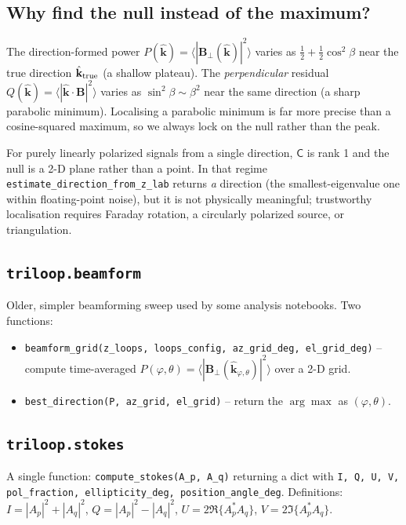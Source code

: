 \documentclass[11pt]{article}
\begin{document}
\subsection{Why find the null instead of the maximum?}
\label{sec:rank1ref}

The direction-formed power
$P(\hat{\mathbf k}) = \langle|\mathbf B_\perp(\hat{\mathbf k})|^2\rangle$
varies as $\frac12 + \frac12\cos^2\beta$ near the true direction
$\hat{\mathbf k}_{\rm true}$ (a shallow plateau).  The
\emph{perpendicular} residual
$Q(\hat{\mathbf k}) = \langle|\hat{\mathbf k}\cdot\mathbf B|^2\rangle$
varies as $\sin^2\beta\sim\beta^2$ near the same direction (a sharp
parabolic minimum).  Localising a parabolic minimum is far more
precise than a cosine-squared maximum, so we always lock on the null
rather than the peak.

For purely linearly polarized signals from a single direction,
$\mathsf{C}$ is rank 1 and the null is a 2-D plane rather than a
point.  In that regime \texttt{estimate\_direction\_from\_z\_lab}
returns \emph{a} direction (the smallest-eigenvalue one within
floating-point noise), but it is not physically meaningful; trustworthy
localisation requires Faraday rotation, a circularly polarized source,
or triangulation.

\subsection{\texttt{triloop.beamform}}

Older, simpler beamforming sweep used by some analysis notebooks.
Two functions:

\begin{itemize}\itemsep=2pt
\item \texttt{beamform\_grid(z\_loops, loops\_config, az\_grid\_deg,
      el\_grid\_deg)} -- compute time-averaged
      $P(\varphi, \theta) = \langle|\mathbf B_\perp(\hat{\mathbf k}_{\varphi,\theta})|^2\rangle$
      over a 2-D grid.
\item \texttt{best\_direction(P, az\_grid, el\_grid)} -- return the
      $\arg\max$ as $(\varphi, \theta)$.
\end{itemize}

\subsection{\texttt{triloop.stokes}}

A single function: \texttt{compute\_stokes(A\_p, A\_q)} returning a
dict with \texttt{I, Q, U, V, pol\_fraction, ellipticity\_deg,
position\_angle\_deg}.  Definitions:
$I = |A_p|^2 + |A_q|^2$,
$Q = |A_p|^2 - |A_q|^2$,
$U = 2\Re\{A_p^*A_q\}$,
$V = 2\Im\{A_p^*A_q\}$.
\end{document}
